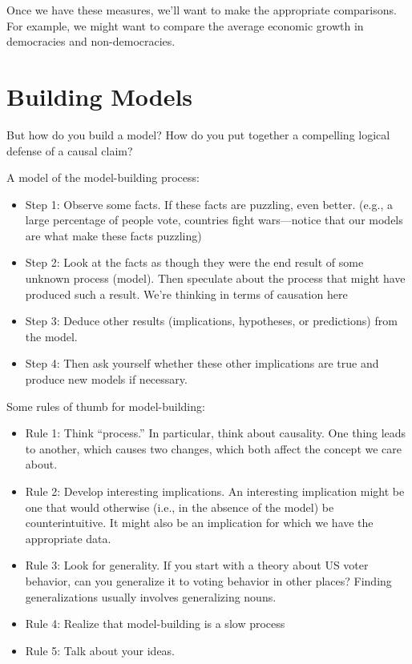 \documentclass[]{book}
\providecommand{\tightlist}{%
  \setlength{\itemsep}{0pt}\setlength{\parskip}{0pt}}
\theoremstyle{definition}
\theoremstyle{definition}
\theoremstyle{definition}
\theoremstyle{remark}
\begin{document}
Once we have these measures, we'll want to make the appropriate
comparisons. For example, we might want to compare the average economic
growth in democracies and non-democracies.

\section{Building Models}\label{building-models}

But how do you build a model? How do you put together a compelling
logical defense of a causal claim?

A model of the model-building process:

\begin{itemize}
\tightlist
\item
  Step 1: Observe some facts. If these facts are puzzling, even better.
  (e.g., a large percentage of people vote, countries fight
  wars---notice that our models are what make these facts puzzling)
\item
  Step 2: Look at the facts as though they were the end result of some
  unknown process (model). Then speculate about the process that might
  have produced such a result. We're thinking in terms of causation here
\item
  Step 3: Deduce other results (implications, hypotheses, or
  predictions) from the model.
\item
  Step 4: Then ask yourself whether these other implications are true
  and produce new models if necessary.
\end{itemize}

Some rules of thumb for model-building:

\begin{itemize}
\tightlist
\item
  Rule 1: Think ``process.'' In particular, think about causality. One
  thing leads to another, which causes two changes, which both affect
  the concept we care about.
\item
  Rule 2: Develop interesting implications. An interesting implication
  might be one that would otherwise (i.e., in the absence of the model)
  be counterintuitive. It might also be an implication for which we have
  the appropriate data.
\item
  Rule 3: Look for generality. If you start with a theory about US voter
  behavior, can you generalize it to voting behavior in other places?
  Finding generalizations usually involves generalizing nouns.
\item
  Rule 4: Realize that model-building is a slow process
\item
  Rule 5: Talk about your ideas.
\end{itemize}
\end{document}

